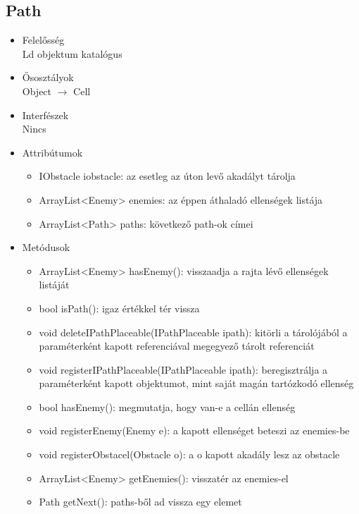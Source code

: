 \subsection{Path}
\begin{itemize}
\item Felelősség\\
Ld objektum katalógus
\item Ősosztályok\\
Object $\rightarrow$ Cell
\item Interfészek\\
Nincs
\item Attribútumok\\
	\begin{itemize}
		\item IObstacle iobstacle: az esetleg az úton levő akadályt tárolja
		\item ArrayList<Enemy> enemies: az éppen áthaladó ellenségek listája
		\item ArrayList<Path> paths: következő path-ok címei

		
	\end{itemize}
\item Metódusok\\
	\begin{itemize}
		\item ArrayList<Enemy> hasEnemy(): visszaadja a rajta lévő ellenségek listáját
		\item bool isPath(): igaz értékkel tér vissza
		\item void deleteIPathPlaceable(IPathPlaceable ipath): kitörli a tárolójából a paraméterként kapott referenciával megegyező tárolt referenciát
		\item void registerIPathPlaceable(IPathPlaceable ipath): beregisztrálja a paraméterként kapott objektumot, mint saját magán tartózkodó ellenség
		\item bool hasEnemy(): megmutatja, hogy van-e a cellán ellenség
		\item void registerEnemy(Enemy e): a kapott ellenséget beteszi az enemies-be
		\item void registerObstacel(Obstacle o): a o kapott akadály lesz az obstacle
		\item ArrayList<Enemy> getEnemies(): visszatér az enemies-el
		\item Path getNext(): paths-ből ad vissza egy elemet
		
		
	\end{itemize}
\end{itemize}

